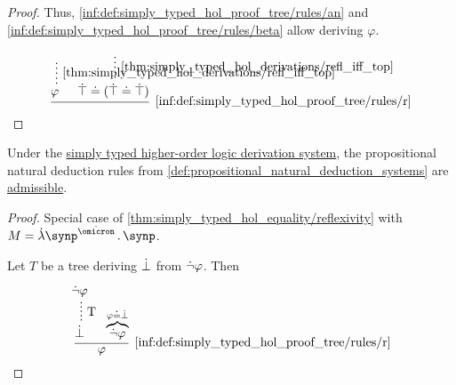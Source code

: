 \begin{proof}
  Thus, \ref{inf:def:simply_typed_hol_proof_tree/rules/an} and \ref{inf:def:simply_typed_hol_proof_tree/rules/beta} allow deriving \( \varphi \).

  \small
  \begin{equation*}
    \begin{prooftree}
      \hypo{}
      \ellipsis { \ref{thm:simply_typed_hol_derivations/refl_iff_top} } { \varphi }

      \hypo{}
      \ellipsis { \ref{thm:simply_typed_hol_derivations/refl_iff_top} } { \syntop \syneq (\syntop \syneq \syntop) }

      \infer2[\ref{inf:def:simply_typed_hol_proof_tree/rules/r}]{}
    \end{prooftree}
  \end{equation*}
  \normalsize
\end{proof}

\begin{proposition}\label{thm:simply_typed_hol_natural_deduction}
  Under the \hyperref[def:simply_typed_hol_proof_tree]{simply typed higher-order logic derivation system}, the propositional natural deduction rules from \cref{def:propositional_natural_deduction_systems} are \hyperref[con:inference_rule_admissibility]{admissible}.
\end{proposition}
\begin{proof}
   Special case of \cref{thm:simply_typed_hol_equality/reflexivity} with \( M = \qabs {\synp^{\syn\omicron}} \synp \).

   Let \( T \) be a tree deriving \( \dot{\bot} \) from \( \dot{\neg} \varphi \). Then

  \begin{equation*}
    \begin{prooftree}
      \hypo{ \synneg \varphi }
      \ellipsis { T } { \synbot }

      \hypo { \overbrace{\synneg \varphi}^{\varphi \syneq \synbot} }

      \infer2[\ref{inf:def:simply_typed_hol_proof_tree/rules/r}]{ \varphi }
    \end{prooftree}
  \end{equation*}
\end{proof}

\begin{definition}\label{def:nth_order_logic}
\end{definition}

\begin{definition}\label{def:simply_typed_definitional_extension}\mimprovised
\end{definition}
